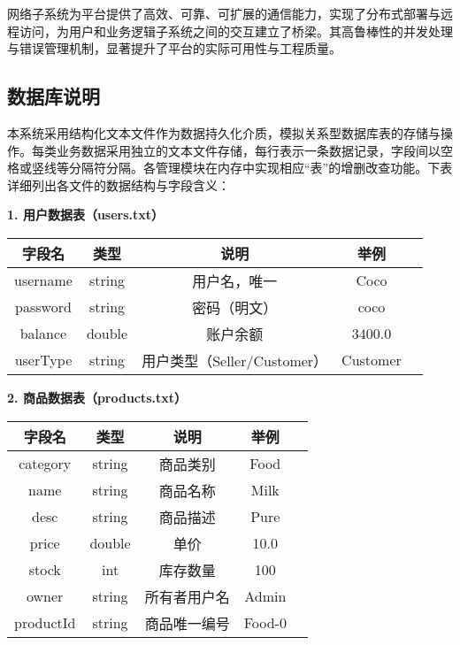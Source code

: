 \documentclass[11pt]{article}
\begin{document}
\vspace{0.5em}
网络子系统为平台提供了高效、可靠、可扩展的通信能力，实现了分布式部署与远程访问，为用户和业务逻辑子系统之间的交互建立了桥梁。其高鲁棒性的并发处理与错误管理机制，显著提升了平台的实际可用性与工程质量。


\subsection{数据库说明}

本系统采用结构化文本文件作为数据持久化介质，模拟关系型数据库表的存储与操作。每类业务数据采用独立的文本文件存储，每行表示一条数据记录，字段间以空格或竖线等分隔符分隔。各管理模块在内存中实现相应“表”的增删改查功能。下表详细列出各文件的数据结构与字段含义：

\vspace{0.5em}
\textbf{1. 用户数据表（users.txt）}
\begin{center}
\begin{tabular}{|c|c|c|c|c|}
\hline
\textbf{字段名} & \textbf{类型} & \textbf{说明} & \textbf{举例} \\
\hline
username & string & 用户名，唯一 & Coco \\
password & string & 密码（明文） & coco \\
balance  & double & 账户余额    & 3400.0 \\
userType & string & 用户类型（Seller/Customer） & Customer \\
\hline
\end{tabular}
\end{center}

\vspace{0.5em}
\textbf{2. 商品数据表（products.txt）}
\begin{center}
\begin{tabular}{|c|c|c|c|c|}
\hline
\textbf{字段名} & \textbf{类型} & \textbf{说明} & \textbf{举例} \\
\hline
category    & string & 商品类别      & Food \\
name        & string & 商品名称      & Milk \\
desc        & string & 商品描述      & Pure \\
price       & double & 单价         & 10.0 \\
stock       & int    & 库存数量      & 100 \\
owner       & string & 所有者用户名   & Admin \\
productId   & string & 商品唯一编号   & Food-0 \\
\hline
\end{tabular}
\end{center}
\end{document}
